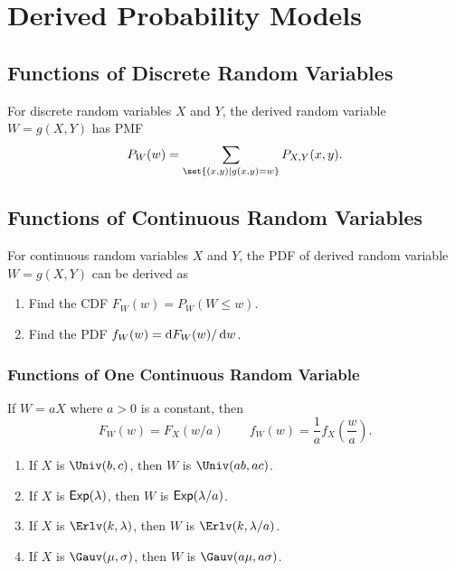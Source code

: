\chapter{Derived Probability Models}

\section{Functions of Discrete Random Variables}
\begin{theorem}
    For discrete random variables $X$ and $Y$, the derived random variable $W=g(X,Y)$ has \textnormal{PMF}
    \[P_W(w)=\sum_{\set{(x,y) \mid g(x,y)=w}}P_{X,Y}(x,y).\]
\end{theorem}

\section{Functions of Continuous Random Variables}
\begin{theorem}\label{thm:pdf_of_derived_rv}
    For continuous random variables $X$ and $Y$, the \textnormal{PDF} of derived random variable $W=g(X,Y)$ can be derived as
    \begin{enumerate}
        \item Find the \textnormal{CDF} $F_W(w)=P_W(W\leq w)$.
        \item Find the \textnormal{PDF} $f_W(w)=\mathop{}\!\mathrm{d} F_W(w)/\mathop{}\!\mathrm{d} w$.
    \end{enumerate}
\end{theorem}

\subsection{Functions of One Continuous Random Variable}
\begin{theorem}
    If $W=aX$ where $a>0$ is a constant, then
    \[F_W(w)=F_X(w/a) \qquad f_W(w)=\frac{1}{a}f_X(\frac{w}{a}).\]
    \begin{enumerate}
        \item If $X$ is $\Univ(b,c)$, then $W$ is $\Univ(ab,ac)$.
        \item If $X$ is $\mathsf{Exp}(\lambda)$, then $W$ is $\mathsf{Exp}(\lambda/a)$.
        \item If $X$ is $\Erlv(k,\lambda)$, then $W$ is $\Erlv(k,\lambda/a)$.
        \item If $X$ is $\Gauv(\mu,\sigma)$, then $W$ is $\Gauv(a\mu,a\sigma)$.
    \end{enumerate}
\end{theorem}

